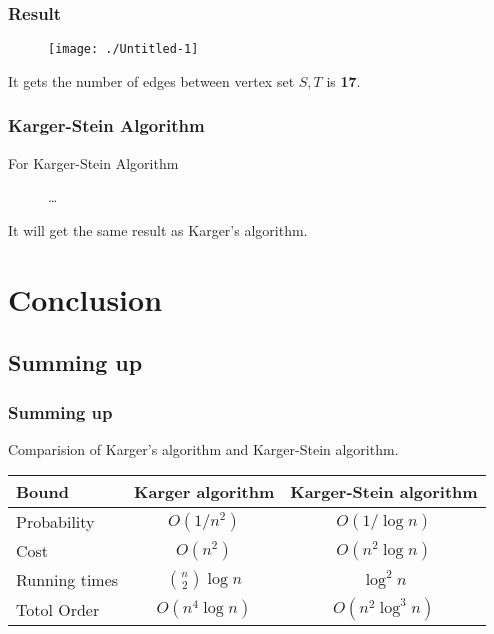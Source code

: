 \documentclass[compress,blue]{beamer}
\begin{document}
	\begin{frame}[c]
		\frametitle{Result}
	\begin{figure}[h]
	\centering
	\texttt{[image: ./Untitled-1]}
	\label{fig:Untitled-1}
	\end{figure}
	\vspace{2em}
	It gets the number of edges between vertex set $ S,T $ is \textbf{17}.
	\end{frame}
	
	\begin{frame}[c]
	\frametitle{Karger-Stein Algorithm}
	For Karger-Stein Algorithm
	\begin{figure}
		\centering
		\tiny
		\lstset{language=python}
			
		\dots
		\lstset{language=python}
			
	\end{figure}
	It will get the same result as Karger's algorithm.
	\end{frame}
	
\section{Conclusion}
	\subsection{Summing up}
	
	\begin{frame}[c]
	\frametitle{Summing up}
	Comparision of Karger's algorithm and Karger-Stein algorithm.
		\begin{center}
		\begin{tabular}{ l || c | c }
		    \hline
		    \textbf{Bound}  & \textbf{Karger algorithm} & \textbf{Karger-Stein algorithm} \\ \hline
		    Probability & $ O(1/n^2) $ & $ O(1/\log n) $    \\ \hline
		    Cost & $ O(n^2) $ & $ O(n^2\log n) $ \\ \hline
		    Running times & $ {n \choose 2}\log n $ & $  \log^2 n $ \\ \hline
		    Totol Order & $ O(n^4\log n) $  & $ O(n^2 \log^3 n) $ \\
		    \hline
		\end{tabular}
		\end{center}
	\end{frame}
	
\end{document}
